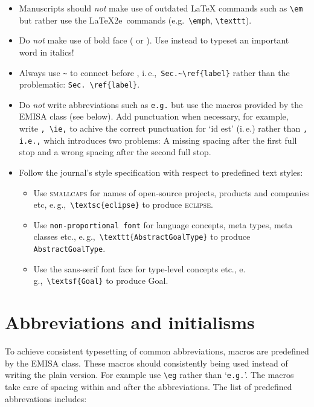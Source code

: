 \documentclass[a4paper]{ltxdoc}
\providecommand*\pkg[1]{\textsf{#1}}
\begin{document}
\begin{itemize}

\item Manuscripts should \emph{not} make use of outdated \LaTeX{} commands such as \verb|\em| but rather use the \LaTeX2e\ commands (e.g.\ \verb|\emph|, \verb|\texttt|). 


\item Do \emph{not} make use of bold face ( or ). Use  instead to typeset an important word in italics!

\item Always use \verb|~| to connect before , i.\,e.,\ \verb|Sec.~\ref{label}| rather than the problematic: \verb|Sec. \ref{label}|.

\item Do \emph{not} write abbreviations such as \verb|e.g.| but use the macros provided by the \pkg{EMISA} class (see below). Add punctuation when necessary, for example, write \verb|, \ie,| to achive the correct punctuation for ‘id est’ (i.\,e.) rather than \verb|, i.e.,| which introduces two problems: A missing spacing after the first full stop and a wrong spacing after the second full stop.



\item Follow the journal's style specification with respect to predefined text styles:

	\begin{itemize}
	\item Use \textsc{smallcaps} for names of open-source projects, products and companies etc, e.\,g.,\ \verb|\textsc{eclipse}| to produce \textsc{eclipse}.
	\item Use \texttt{non-proportional font} for language concepts, meta types, meta classes etc., e.\,g.,\ \verb|\texttt{AbstractGoalType}| to produce \texttt{AbstractGoalType}. 
	\item Use the \textsf{sans-serif font face} for type-level concepts etc., e.\,g.,\ \verb|\textsf{Goal}| to produce \textsf{Goal}.
	\end{itemize}

\end{itemize}







\section{Abbreviations and initialisms}
\DescribeMacro{\eg}\DescribeMacro{\ie}\DescribeMacro{\cf}\DescribeMacro{\etal}%
To achieve consistent typesetting of common abbreviations, macros are predefined by the \pkg{EMISA} class. These macros should consistently being used instead of writing the plain version. For example use \verb|\eg| rather than ‘\verb|e.g.|’. The macros take care of spacing within and after the abbreviations. The list of predefined abbrevations includes: %
\end{document}
